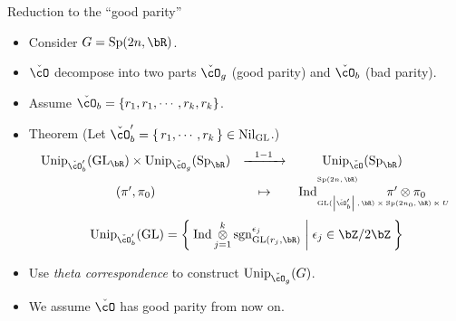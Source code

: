 \documentclass[t,mathserif,11pt,usenames,dvipsnames]{beamer}
\theoremstyle{plain}
\theoremstyle{definition}
\def\sgn{{\rm sgn}}
\def\abs#1{\left|{#1}\right|}
\def\GL{\mathrm{GL}}
\def\Ind{{\rm Ind}}
\def\Sp{{\mathrm{Sp}}}
\def\Unip{{\mathrm{Unip}}}
\def\ckcO{{\check{\cO}}}
\def\Nil{\mathrm{Nil}}
\def\blue{\color{blue}}
\def\red{\color{red}}
\def\lblue{\color{blue}}
\let\oldemph\emph
\def\emph#1{\oldemph{\blue #1}}
\begin{document}
    \begin{frame}{Reduction to the ``good parity''}
        \begin{itemize}[<+->]
            \item Consider $G= \Sp(2n,\bR)$. 
            \item  $\ckcO$ decompose into two parts $\ckcO_{g}$ (good parity)  and $\ckcO_{b}$ (bad parity).
            \item Assume $\ckcO_{b} = \{r_1, r_1, \cdots, r_k, r_k\}$.
            \item[] {\lblue Theorem} (Let $\ckcO'_b = \set{r_1,\cdots, r_k}\in \Nil_{\GL}$.)
            \[
            \hspace{-2em}
            \begin{array}{ccc}
                {\tiny\Unip_{\ckcO'_b}(\GL_\bR)
                \times \Unip_{\ckcO_g}(\Sp_\bR)} &\xrightarrow{\ \ 1-1\ \ }&
                {\tiny \Unip_{\ckcO}(\Sp_\bR)} \\[.6em]
                (\pi',\pi_0 ) &\mapsto & 
                \Ind_{\raisebox{-0.5em}{\tiny$\GL(\abs{\ckcO'_b},\bR)\times \Sp(2n_0,\bR)\ltimes U$}}^{\tiny\raisebox{1em}{$\Sp(2n,\bR)$}}
                \hspace{-5em}\pi'\otimes \pi_0
            \end{array}
            \]
            \[
            \begin{split}
                {\tiny\Unip_{\ckcO'_b}(\GL)}
                = 
                \Set{\Ind \mathop{\otimes}_{j=1}^k \sgn^{\epsilon_j}_{\GL(r_j,\bR)}
                |\epsilon_j \in \bZ/2\bZ}
            \end{split}
            \]
            \item Use \emph{theta correspondence}  to construct 
            $ \Unip_{\ckcO_{g}}(G)$.
            \item We assume  $\ckcO$ has {\red good parity} from now on.
        \end{itemize}
    \end{frame}
    
\end{document}
